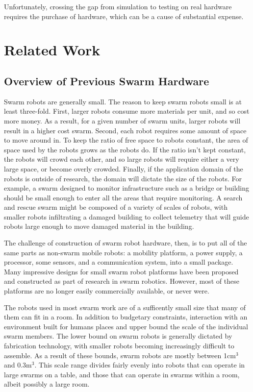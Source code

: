 \documentclass[]{article}
\begin{document}
Unfortunately, crossing the gap from simulation to testing on real hardware requires the purchase of hardware, which can be a cause of substantial expense. 

\section{Related Work}

\subsection{Overview of Previous Swarm Hardware}

Swarm robots are generally small. 
The reason to keep swarm robots small is at least three-fold. 
First, larger robots consume more materials per unit, and so cost more money.
As a result, for a given number of swarm units, larger robots will result in a higher cost swarm. 
Second, each robot requires some amount of space to move around in. 
To keep the ratio of free space to robots constant, the area of space used by the robots grows as the robots do. 
If the ratio isn't kept constant, the robots will crowd each other, and so large robots will require either a very large space, or become overly crowded.
Finally, if the application domain of the robots is outside of research, the domain will dictate the size of the robots. 
For example, a swarm designed to monitor infrastructure such as a bridge or building should be small enough to enter all the areas that require monitoring. 
A search and rescue swarm might be composed of a variety of scales of robots, with smaller robots infiltrating a damaged building to collect telemetry that will guide robots large enough to move damaged material in the building. 

The challenge of construction of swarm robot hardware, then, is to put all of the same parts as non-swarm mobile robots: a mobility platform, a power supply, a processor, some sensors, and a communication system, into a small package.
Many impressive designs for small swarm robot platforms have been proposed and constructed as part of research in swarm robotics. 
However, most of these platforms are no longer easily commercially available, or never were. 

The robots used in most swarm work are of a sufficently small size that many of them can fit in a room. In addition to budgetary constraints, interaction with an environment built for humans places and upper bound the scale of the individual swarm members. 
The lower bound on swarm robots is generally dictated by fabrication technology, with smaller robots becoming increasingly difficult to assemble. 
As a result of these bounds, swarm robots are mostly between 1cm$^3$ and 0.3m$^3$. 
This scale range divides fairly evenly into robots that can operate in large swarms on a table, and those that can operate in swarms within a room, albeit possibly a large room. 
\end{document}
